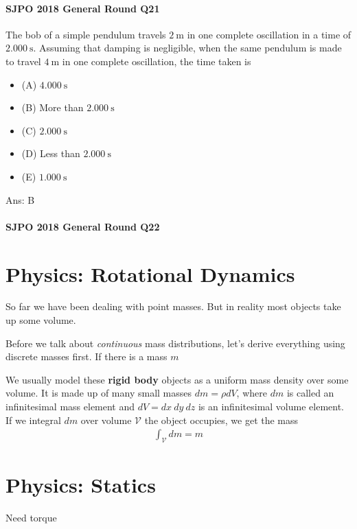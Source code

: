 \documentclass{article}
\begin{document}
\begin{samepage}
\paragraph{SJPO 2018 General Round Q21}
The bob of a simple pendulum travels $2 \mathrm{~m}$ in one complete oscillation in a time of $2.000 \mathrm{~s}$. Assuming that damping is negligible, when the same pendulum is made to travel $4 \mathrm{~m}$ in one complete oscillation, the time taken is
\begin{itemize}
\item[](A) $4.000 \mathrm{~s}$
\item[](B) More than $2.000 \mathrm{~s}$
\item[](C) $2.000 \mathrm{~s}$
\item[](D) Less than $2.000 \mathrm{~s}$
\item[](E) $1.000 \mathrm{~s}$
\end{itemize}
Ans: \ifpaper B \fi 
\end{samepage}
\begin{samepage}
\paragraph{SJPO 2018 General Round Q22}

\end{samepage}


\section{Physics: Rotational Dynamics}
So far we have been dealing with point masses. But in reality most objects take up some volume. 

Before we talk about \textit{continuous} mass distributions, let's derive everything using discrete masses first. If there is a mass $m$ 

We usually model these \textbf{rigid body} objects as a uniform mass density over some volume. It is made up of many small masses $dm = \rho dV$, where $dm$ is called an infinitesimal mass element and $dV = dx\ dy\ dz$ is an infinitesimal volume element. If we integral $dm$ over volume $\mathcal{V}$ the object occupies, we get the mass
\begin{align}
    \int_{\mathcal V} dm = m
\end{align}

\section{Physics: Statics}
Need torque
\end{document}
